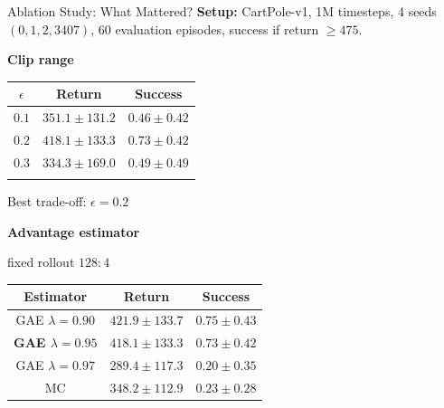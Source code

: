 \documentclass[aspectratio=169, 11pt]{beamer}
\begin{document}
\begin{frame}{Ablation Study: What Mattered?}
  \scriptsize
  \textbf{Setup:} CartPole-v1, 1M timesteps, 4 seeds $(0,1,2,3407)$,
  60 evaluation episodes, success if return $\ge 475$.

  \vspace{0.4em}
  \noindent\hspace*{\fill}%
    \begin{minipage}[t]{0.31\textwidth}\vspace{0pt}
      \textbf{Clip range}\par\vspace{0.2em}
      {\raggedright\tiny\setlength{\tabcolsep}{2pt}\renewcommand{\arraystretch}{1.15}%
      \begin{tabular}{@{}ccc@{}}
        \toprule
        $\epsilon$ & Return & Success \\
        \midrule
        $0.1$ & $351.1 \pm 131.2$ & $0.46 \pm 0.42$ \\
        \textbf{$0.2$} & \textbf{$418.1 \pm 133.3$} & \textbf{$0.73 \pm 0.42$} \\
        $0.3$ & $334.3 \pm 169.0$ & $0.49 \pm 0.49$ \\
        \multicolumn{3}{c}{\phantom{$0.0 \pm 0.0$}} \\
        \bottomrule
      \end{tabular}\par
      }

      \vspace{0.5em}
      \textcolor{successgreen}{Best trade-off: $\epsilon=0.2$}
    \end{minipage}%
    \hspace*{\fill}%
    \begin{minipage}[t]{0.34\textwidth}\vspace{0pt}
      \textbf{Advantage estimator}\par
      {\tiny fixed rollout $128{:}4$}\par\vspace{0.2em}
      {\raggedright\tiny\setlength{\tabcolsep}{2pt}\renewcommand{\arraystretch}{1.15}%
      \begin{tabular}{@{}ccc@{}}
        \toprule
        Estimator & Return & Success \\
        \midrule
        GAE $\lambda=0.90$ & $421.9 \pm 133.7$ & $0.75 \pm 0.43$ \\
        \textbf{GAE $\lambda=0.95$} & \textbf{$418.1 \pm 133.3$} & \textbf{$0.73 \pm 0.42$} \\
        GAE $\lambda=0.97$ & $289.4 \pm 117.3$ & $0.20 \pm 0.35$ \\
        MC & $348.2 \pm 112.9$ & $0.23 \pm 0.28$ \\
        \bottomrule
      \end{tabular}\par
      }


\end{minipage}
\end{frame}
\end{document}
